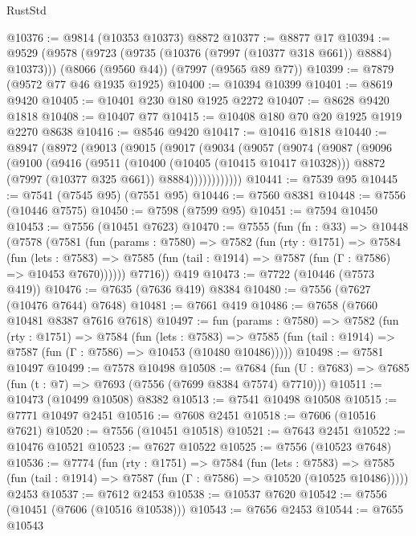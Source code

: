 \begin{lexlean}{RustStd}
\begin{coremodule}
{\begin{coremodule}
{{{{{{{{{{{{{{{{{{{{{{{{{{{{{{{{{{{{{{{{{{{@10376 := @9814 (@10353 @10373) @8872
@10377 := @8877 @17
@10394 := @9529
    (@9578 (@9723 (@9735 (@10376 (@7997 (@10377 @318 @661)) @8884) @10373)))
    (@8066 (@9560 @44))
    (@7997 (@9565 @89 @77))
@10399 := @7879 (@9572 @77 @46 @1935 @1925)
@10400 := @10394 @10399
@10401 := @8619 @9420
@10405 := @10401 @230 @180 @1925 @2272
@10407 := @8628 @9420 @1818
@10408 := @10407 @77
@10415 := @10408 @180 @70 @20 @1925 @1919 @2270 @8638
@10416 := @8546 @9420
@10417 := @10416 @1818
@10440 := @8947
    (@8972
      (@9013
        (@9015
          (@9017
            (@9034
              (@9057
                (@9074
                  (@9087
                    (@9096
                      (@9100
                        (@9416
                          (@9511
                            (@10400 (@10405 (@10415 @10417 @10328)))
                            @8872
                            (@7997 (@10377 @325 @661))
                            @8884))))))))))))
@10441 := @7539 @95
@10445 := @7541 (@7545 @95) (@7551 @95)
@10446 := @7560 @8381
@10448 := @7556 (@10446 @7575)
@10450 := @7598 (@7599 @95)
@10451 := @7594 @10450
@10453 := @7556 (@10451 @7623)
@10470 := @7555
    (fun (fn : @33) =>
    @10448
      (@7578
        (@7581
          (fun (params : @7580) =>
          @7582
            (fun (rty : @1751) =>
            @7584
              (fun (lets : @7583) =>
              @7585 (fun (tail : @1914) => @7587 (fun (Γ : @7586) => @10453 @7670))))))
        @7716))
    @419
@10473 := @7722 (@10446 (@7573 @419))
@10476 := @7635 (@7636 @419) @8384
@10480 := @7556 (@7627 (@10476 @7644) @7648)
@10481 := @7661 @419
@10486 := @7658 (@7660 @10481 @8387 @7616 @7618)
@10497 := fun (params : @7580) =>
  @7582
    (fun (rty : @1751) =>
    @7584
      (fun (lets : @7583) =>
      @7585 (fun (tail : @1914) => @7587 (fun (Γ : @7586) => @10453 (@10480 @10486)))))
@10498 := @7581 @10497
@10499 := @7578 @10498
@10508 := @7684 (fun (U : @7683) => @7685 (fun (t : @7) => @7693 (@7556 (@7699 @8384 @7574) @7710)))
@10511 := @10473 (@10499 @10508) @8382
@10513 := @7541 @10498 @10508
@10515 := @7771 @10497 @2451
@10516 := @7608 @2451
@10518 := @7606 (@10516 @7621)
@10520 := @7556 (@10451 @10518)
@10521 := @7643 @2451
@10522 := @10476 @10521
@10523 := @7627 @10522
@10525 := @7556 (@10523 @7648)
@10536 := @7774
    (fun (rty : @1751) =>
    @7584
      (fun (lets : @7583) =>
      @7585 (fun (tail : @1914) => @7587 (fun (Γ : @7586) => @10520 (@10525 @10486)))))
    @2453
@10537 := @7612 @2453
@10538 := @10537 @7620
@10542 := @7556 (@10451 (@7606 (@10516 @10538)))
@10543 := @7656 @2453
@10544 := @7655 @10543
}}}}}}}}}}}}}}}}}}}}}}}}}}}}}}}}}}}}}}}}}}}
\end{coremodule}}
\end{coremodule}
\end{lexlean}
